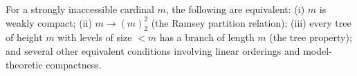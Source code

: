 For a strongly inaccessible cardinal $m$, the following are equivalent:
(i) $m$ is weakly compact;
(ii) $m \rightarrow (m)^2_2$ (the Ramsey partition relation);
(iii) every tree of height $m$ with levels of size $< m$ has a branch of length $m$ (the tree property);
and several other equivalent conditions involving linear orderings and model-theoretic compactness.
